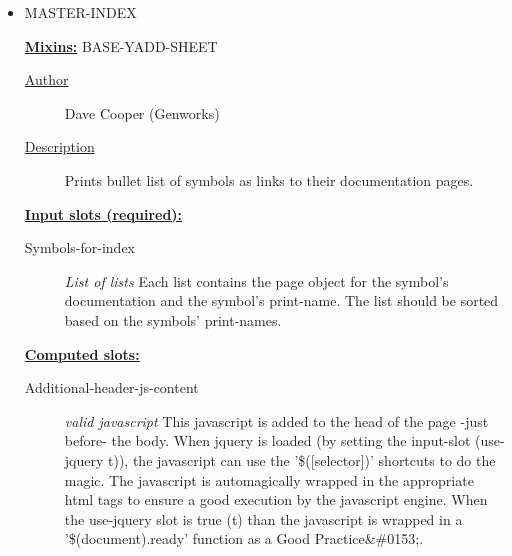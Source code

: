 \documentclass [11pt]{book}
\begin{document}
\begin{itemize}
\begin{description}
\end{description}







\item {}MASTER-INDEX


\textbf{
\underline{Mixins:}} BASE-YADD-SHEET





\begin{description}

\item [
\underline{Author}]


Dave Cooper (Genworks)



\item [
\underline{Description}]


Prints bullet list of symbols as links to their documentation pages.



\end{description}








\textbf{
\underline{Input slots (required):}}

\begin{description}

\item [Symbols-for-index]
\emph{List of lists} Each list contains the page object for the symbol's
documentation and the symbol's print-name. The list should be sorted
based on the symbols' print-names.


\end{description}






\textbf{
\underline{Computed slots:}}

\begin{description}

\item [Additional-header-js-content]
\emph{valid javascript} This javascript is added to the head of the page -just before- the body.
When jquery is loaded (by setting the input-slot (use-jquery t)), the javascript can use the
'\$([selector])' shortcuts to do the magic. The javascript is automagically wrapped in the
appropriate html tags to ensure a good execution by the javascript engine. When the use-jquery
slot is true (t) than the javascript is wrapped in a '\$(document).ready' function as a
Good Practice&\#0153;.



\end{description}
\end{itemize}
\end{document}
